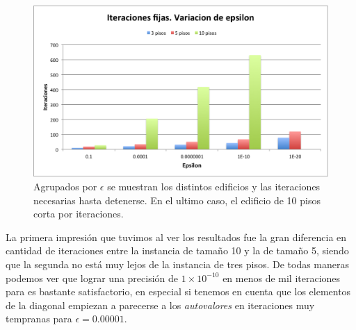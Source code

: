 \documentclass[a4paper]{article}
\begin{document}
\begin{figure}[H]
  \centering
  \includegraphics[scale=0.75]{graficos/1-Cantidad_iteraciones_por_piso.png}
  \caption{Agrupados por $\epsilon$ se muestran los distintos edificios y las iteraciones necesarias hasta detenerse. En el ultimo caso, el edificio de 10 pisos corta por iteraciones.}
\end{figure}

La primera impresión que tuvimos al ver los resultados fue la gran diferencia en cantidad de iteraciones entre la instancia de tamaño 10 y la de tamaño 5, siendo que la segunda no está muy lejos de la instancia de tres pisos. De todas maneras podemos ver que lograr una precisión de $1\times 10^{-10}$ en menos de mil iteraciones para es bastante satisfactorio, en especial si tenemos en cuenta que los elementos de la diagonal empiezan a parecerse a los \textit{autovalores} en iteraciones muy tempranas para $\epsilon = 0.00001$.

\newpage


\end{document}
